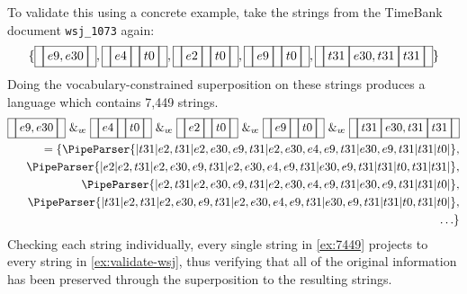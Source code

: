 \documentclass[a4paper,12pt,leqno]{article}
\newcommand{\vph}[1]{\vphantom{#1}}
\newcommand{\ebox}[1]{\fbox{$\vph{'(),}#1$}}
\newcommand{\nbBefore}[2]{\ebox{#1}\ebox{}\ebox{#2}}
\newcommand{\nbDuring}[2]{\ebox{#2}\ebox{#1,#2}\ebox{#2}}
\newcommand{\nbEquals}[2]{\ebox{#1,#2}}
\newcommand{\Before}[2]{\ebox{}\nbBefore{#1}{#2}\ebox{}}
\newcommand{\During}[2]{\ebox{}\nbDuring{#1}{#2}\ebox{}}
\newcommand{\Equals}[2]{\ebox{}\nbEquals{#1}{#2}\ebox{}}
\newcommand{\spvc}{~\&_{v\!c}~}
\newcommand{\EventString}[1]{%
	\renewcommand*{\do}[1]{\ebox{##1}}%
	\PipeParser{#1}%
}
\begin{document}
To validate this using a concrete example, take the strings from the TimeBank document \verb|wsj_1073| again:
\begin{align}
	\{\Equals{e9}{e30}, \Before{e4}{t0}, \Before{e2}{t0}, \Before{e9}{t0}, \During{e30}{t31}\}\label{ex:validate-wsj}
\end{align}
Doing the vocabulary-constrained superposition on these strings produces a language which contains 7,449 strings.
\begin{align}
	\Equals{e9}{e30} \spvc \Before{e4}{t0} \spvc \Before{e2}{t0} \spvc \Before{e9}{t0} \spvc \During{e30}{t31}\\
	= \{ \EventString{{}|t31|e2,t31|e2,e30,e9,t31|e2,e30,e4,e9,t31|e30,e9,t31|t31|t0|{}},\label{ex:7449}\\
	\EventString{{}|e2|e2,t31|e2,e30,e9,t31|e2,e30,e4,e9,t31|e30,e9,t31|t31|t0,t31|t31|{}},\notag\\
	\EventString{{}|e2,t31|e2,e30,e9,t31|e2,e30,e4,e9,t31|e30,e9,t31|t31|t0|{}},\notag\\
	\EventString{{}|t31|e2,t31|e2,e30,e9,t31|e2,e30,e4,e9,t31|e30,e9,t31|t31|t0,t31|t0|{}},\notag\\
	\ldots \}\notag
\end{align}
Checking each string individually, every single string in \cref{ex:7449} projects to every string in \cref{ex:validate-wsj}, thus verifying that all of the original information has been preserved through the superposition to the resulting strings.
\end{document}
